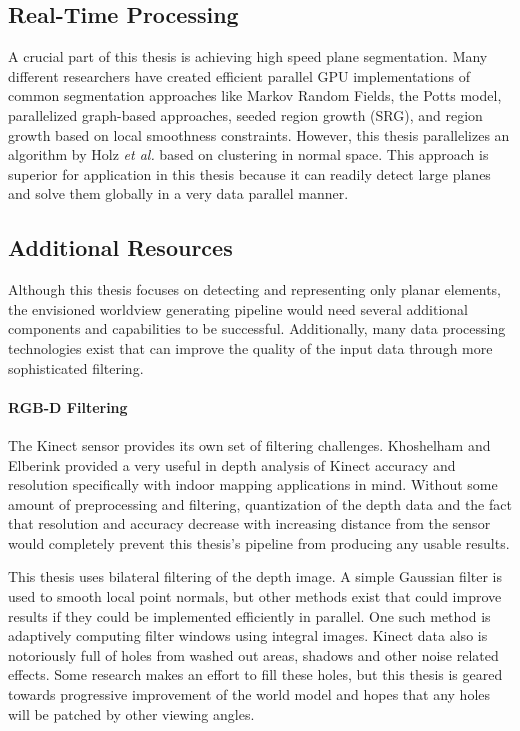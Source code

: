 \subsection{Real-Time Processing}
A crucial part of this thesis is achieving high speed plane segmentation. Many different researchers have created efficient parallel GPU implementations of common segmentation approaches like Markov Random Fields\cite{arques2006real}, the Potts model\cite{abramov2011real}, parallelized graph-based approaches\cite{wassenberg2009efficient}, seeded region growth (SRG)\cite{pichelparallel}, and region growth based on local smoothness constraints\cite{rabbani2006segmentation}. However, this thesis parallelizes an algorithm by Holz \textit{et al.} \cite{holz2012real} based on clustering in normal space. This approach is superior for application in this thesis because it can readily detect large planes and solve them globally in a very data parallel manner.
\subsection{Additional Resources}
Although this thesis focuses on detecting and representing only planar elements, the envisioned worldview generating pipeline would need several additional components and capabilities to be successful. Additionally, many data processing technologies exist that can improve the quality of the input data through more sophisticated filtering.
\paragraph{RGB-D Filtering}
The Kinect sensor provides its own set of filtering challenges. Khoshelham and Elberink provided a very useful in depth analysis of Kinect accuracy and resolution specifically with indoor mapping applications in mind\cite{khoshelham2012accuracy}. Without some amount of preprocessing and filtering, quantization of the depth data and the fact that resolution and accuracy decrease with increasing distance from the sensor would completely prevent this thesis's pipeline from producing any usable results.\par
This thesis uses bilateral filtering of the depth image\cite{pham2005separable,tomasi1998bilateral}. A simple Gaussian filter is used to smooth local point normals, but other methods exist that could improve results if they could be implemented efficiently in parallel. One such method is adaptively computing filter windows using integral images\cite{holzer2012adaptive}. Kinect data also is notoriously full of holes from washed out areas, shadows and other noise related effects. Some research makes an effort to fill these holes\cite{dakkak2012recovering,spinello2011people,xia2011human}, but this thesis is geared towards progressive improvement of the world model and hopes that any holes will be patched by other viewing angles.

